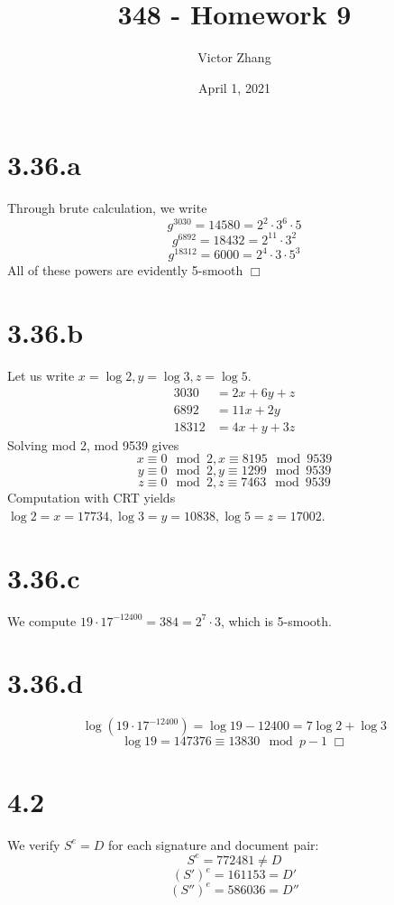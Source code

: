 \documentclass{article}
\title{348 - Homework 9}
\author{Victor Zhang}
\date{April 1, 2021}
\begin{document}
\maketitle

\section*{3.36.a}
Through brute calculation, we write
$$g^{3030} = 14580 = 2^2 \cdot 3^6 \cdot 5$$
$$g^{6892} = 18432 =  2^{11} \cdot 3^2$$
$$g^{18312} = 6000 = 2^4 \cdot 3 \cdot 5^3$$
All of these powers are evidently 5-smooth $\Box$

\section*{3.36.b}
Let us write $x = \log 2, y = \log 3, z = \log 5$.
\begin{equation*}
\begin{split}
3030 &= 2x + 6y + z\\
6892 &= 11x + 2y\\
18312 &= 4x + y + 3z
\end{split}
\end{equation*}
Solving mod 2, mod 9539 gives
$$x \equiv 0 \!\!\!\mod 2, x \equiv 8195 \!\!\!\mod 9539$$
$$y \equiv 0 \!\!\!\mod 2, y \equiv 1299 \!\!\!\mod 9539$$
$$z \equiv 0 \!\!\!\mod 2, z \equiv 7463 \!\!\!\mod 9539$$
Computation with CRT yields $\log 2 = x = 17734, \log 3 = y = 10838, \log 5 = z = 17002$.

\section*{3.36.c}
We compute $19 \cdot 17^{-12400} = 384 = 2^7 \cdot 3$, which is 5-smooth.

\section*{3.36.d}
$$\log (19 \cdot 17^{-12400}) = \log 19 - 12400 = 7 \log 2 + \log 3$$
$$\log 19 = 147376 \equiv 13830 \!\!\!\mod p-1\; \Box$$

\section*{4.2}
We verify $S^e = D$ for each signature and document pair:\\
$$S^e = 772481 \neq D$$
$$(S')^e = 161153 = D'$$
$$(S'')^e = 586036 = D''$$
\end{document}
